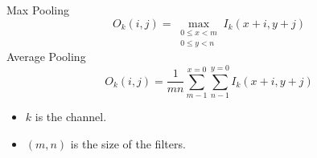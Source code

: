 \documentclass[utf8x,hyperref={pdfpagelabels=false}]{beamer}
\begin{document}
\begin{frame}
Max Pooling
\begin{displaymath}
O_k(i, j) = \max_{\substack{0 \leq x < m \\ 0 \leq y < n}} I_k(x + i, y + j)
\end{displaymath}
Average Pooling
\begin{displaymath}
O_k(i, j) = \frac{1}{mn}\sum^{x = 0}_{m - 1} \sum^{y = 0}_{n - 1} I_k(x + i, y + j)
\end{displaymath}
\begin{itemize}
\item $k$ is the channel.
\item $(m, n)$ is the size of the filters.
\end{itemize}
\end{frame}
\end{document}
